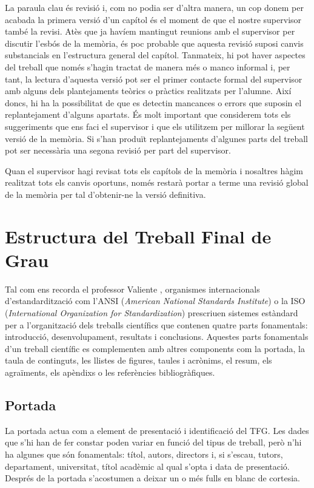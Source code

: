 La paraula clau és revisió i, com no podia ser d'altra manera, un cop donem per acabada la primera versió d'un capítol és el moment de que el nostre supervisor també la revisi. Atès que ja havíem mantingut reunions amb el supervisor per discutir l'esbós de la memòria, és poc probable que aquesta revisió suposi canvis substancials en l'estructura general del capítol. Tanmateix, hi pot haver aspectes del treball que només s'hagin tractat de manera més o manco informal i, per tant, la lectura d'aquesta versió pot ser el primer contacte formal del supervisor amb alguns dels plantejaments teòrics o pràctics realitzats per l'alumne. Així doncs, hi ha la possibilitat de que es detectin mancances o errors que suposin el replantejament d'alguns apartats. És molt important que considerem tots els suggeriments que ens faci el supervisor i que els utilitzem per millorar la següent versió de la memòria. Si s'han produït replantejaments d'algunes parts del treball pot ser necessària una segona revisió per part del supervisor.

Quan el supervisor hagi revisat tots els capítols de la memòria i nosaltres hàgim realitzat tots els canvis oportuns, només restarà portar a terme una revisió global de la memòria per tal d'obtenir-ne la versió definitiva.

\section{Estructura del Treball Final de Grau}

Tal com ens recorda el professor Valiente \cite{Valiente96}, organismes internacionals d'estandardització com l'ANSI (\emph{American National Standards Institute}) o la ISO (\emph{International Organization for Standardization}) prescriuen sistemes estàndard per a l'organització dels treballs científics que contenen quatre parts fonamentals: introducció, desenvolupament, resultats i conclusions. Aquestes parts fonamentals d'un treball científic es complementen amb altres components com la portada, la taula de continguts, les llistes de figures, taules i acrònims, el resum, els agraïments, els apèndixs o les referències bibliogràfiques.


\subsection{Portada}

La portada actua com a element de presentació i identificació del \ac{TFG}. Les dades que s'hi han de fer constar poden variar en funció del tipus de treball, però n'hi ha algunes que són fonamentals: títol, autors, directors i, si s'escau, tutors, departament, universitat, títol acadèmic al qual s'opta i data de presentació. Després de la portada s'acostumen a deixar un o més fulls en blanc de cortesia.

